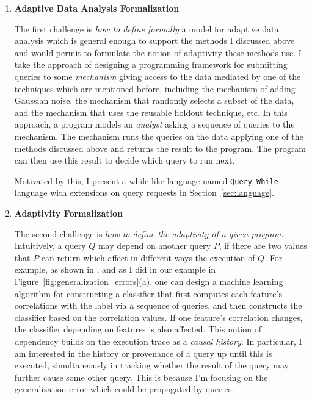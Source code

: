 \begin{enumerate}
 \item
 \textbf{Adaptive Data Analysis Formalization}

The first challenge is \emph{how to define formally} a model for adaptive data analysis which is general enough to support the methods I discussed above and would permit to formulate the notion of adaptivity these methods use. 
I take the approach of designing a programming framework for submitting queries to some \emph{mechanism} giving access 
to the data mediated by one of the techniques which are mentioned before, 
including the mechanism of adding Gaussian noise, 
the mechanism that randomly selects a subset of the data, 
and the mechanism that uses the reusable holdout technique, etc. 
In this approach, a program models an \emph{analyst} asking a sequence of queries to the mechanism. 
The mechanism runs the queries on the data applying one of the methods discussed above and returns the result to the program. The program can then use this result to decide which query to run next. 

Motivated by this, I present a while-like language named {\tt Query While} language with extensions on query requests in Section~\ref{sec:language}.

\item 
\textbf{Adaptivity Formalization}

The second challenge is \emph{how to define the adaptivity of a given program}.
Intuitively, a query $Q$ may depend on another query $P$, if there are two values that $P$ can return which affect in different ways the execution of $Q$. 
For example, as shown in \cite{dwork2015reusable}, and as I did in our example in Figure~\ref{fig:generalization_errors}(a), one can design a machine learning algorithm for constructing a classifier that first computes each feature's correlations with the label via a sequence of queries, and then constructs the classifier based on the correlation values. 
If one feature's correlation changes, the classifier depending on features is also affected. 
This notion of dependency builds on the execution trace as a \emph{causal history}. 
In particular, I am interested in the history or provenance of a query up until this is executed, 
simultaneously in tracking whether the result of the query may further cause some other query. 
This is because I'm focusing on the generalization error which could be propagated by queries.


\end{enumerate}
